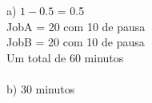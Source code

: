 a) $1 - 0.5$ = 0.5\\
JobA = 20 com 10 de pausa\\
JobB = 20 com 10 de pausa\\
Um total de 60 minutos\\
\\
b) 30 minutos